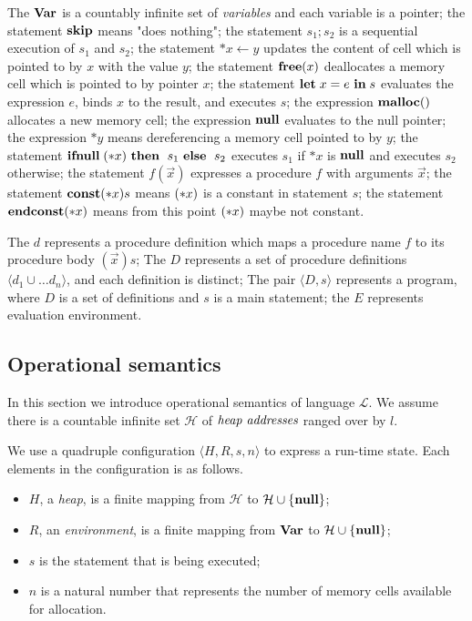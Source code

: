The \(\mathbf{Var}\) is a countably infinite set of \emph{variables} and each
variable is a pointer; the statement \(\mathbf{skip}\) means "does nothing";
the statement \(s_1;s_2\) is a sequential execution of \(s_1\) and
\(s_2\); the statement \(*x \leftarrow y\) updates the content of cell
which is pointed to by \(x\) with the value \(y\); the statement
\(\mathbf{free}(x)\) deallocates a memory cell which is pointed to by pointer
\(x\); the statement \(\mathbf{let}\; x = e\ \mathbf{in}\; s\) evaluates the expression
\(e\), binds \(x\) to the result, and executes \(s\); the expression
\(\mathbf{malloc}()\) allocates a new memory cell; the expression \(\mathbf{null}\)
evaluates to the null pointer; the expression \(*y\) means
dereferencing a memory cell pointed to by \(y\); the statement
\(\IFNULL(*x)\ \THEN\ s_1\ \ELSE\ s_2\) executes \(s_1\) if \(*x\) is
\(\mathbf{null}\) and executes \(s_2\) otherwise; the statement \(f(\vec{x})\)
expresses a procedure \(f\) with arguments \(\vec{x}\); the statement
\(\mathbf{const}(*x) s\) means \((*x)\) is a constant in statement \(s\); the
statement \(\mathbf{endconst}(*x)\) means from this point \((*x)\) maybe not
constant.

The \(d\) represents a procedure definition which maps a procedure
name \(f\) to its procedure body \((\vec{x})s\); The \(D\) represents
a set of procedure definitions \(\langle d_1 \cup\dots d_n \rangle\),
and each definition is distinct; The pair \(\langle D, s \rangle \)
represents a program, where \(D\) is a set of definitions and \(s\) is
a main statement; the \(E\) represents evaluation environment.

\subsection{Operational semantics}
\label{sec:languageSemantics}
In this section we introduce operational semantics of language
\(\mathcal{L}\). We assume there is a countable infinite set
\(\mathcal{H}\) of \(\emph{heap addresses}\) ranged over by \(l\).

We use a quadruple configuration \(\langle H, R, s, n \rangle\) to
express a run-time state. Each elements in the configuration is as
follows.

\begin{itemize}
\item \(H\), a \emph{heap}, is a finite mapping from \(\mathcal{H}\)
  to \(\mathcal{H} \cup \{\mathbf{null}\}\);
\item \(R\), an \emph{environment}, is a finite mapping from \(\mathbf{Var}\)
  to \(\mathcal{H} \cup \{\mathbf{null}\}\);
\item \(s\) is the statement that is being executed; 
\item \(n\) is a natural number that represents the number of memory
  cells available for allocation.
\end{itemize}

